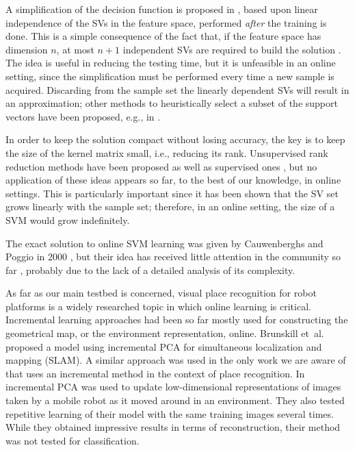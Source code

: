 A simplification of the decision function is proposed in
\cite{DownsGM01}, based upon linear independence of the SVs in the
feature space, performed \emph{after} the training is done. This is a
simple consequence of the fact that, if the feature space has
dimension $n$, at most $n+1$ independent SVs are required to build the
solution \cite{PontilV98}. The idea is useful in reducing the testing
time, but it is unfeasible in an online setting, since the
simplification must be performed every time a new sample is
acquired. Discarding from the sample set the linearly dependent SVs
will result in an approximation; other methods to heuristically select
a subset of the support vectors have been proposed, e.g., in
\cite{LeeM01,schoel06,KeerthiCDC06}.

In order to keep the solution compact without losing accuracy, the key
is to keep the size of the kernel matrix small, i.e., reducing its
rank. Unsupervised rank reduction methods have been proposed
\cite{Baudat03} as well as supervised ones
\cite{BachJordan2005,KeerthiCDC06}, but no application of these ideas
appears so far, to the best of our knowledge, in online settings. This
is particularly important since it has been shown \cite{Steinwart03}
that the SV set grows linearly with the sample set; therefore, in an
online setting, the size of a SVM would grow indefinitely.

The exact solution to online SVM learning was given by Cauwenberghs
and Poggio in 2000 \cite{CauwenberghsP00}, but their idea has received
little attention in the community so far \cite{Laskov2006}, probably
due to the lack of a detailed analysis of its complexity.

As far as our main testbed is concerned, visual place recognition for
robot platforms is a widely researched topic in which online learning
is critical. Incremental learning approaches had been so far mostly
used for constructing the geometrical map, or the environment
representation, online.  Brunskill et~al. \cite{emma:irca05} proposed
a model using incremental PCA for simultaneous localization and
mapping (SLAM). A similar approach was used in the only work we are
aware of that uses an incremental method in the context of place
recognition. In \cite{ljubjiana:icra02} incremental PCA was used to
update low-dimensional representations of images taken by a mobile
robot as it moved around in an environment. They also tested
repetitive learning of their model with the same training images
several times. While they obtained impressive results in terms of
reconstruction, their method was not tested for classification.
